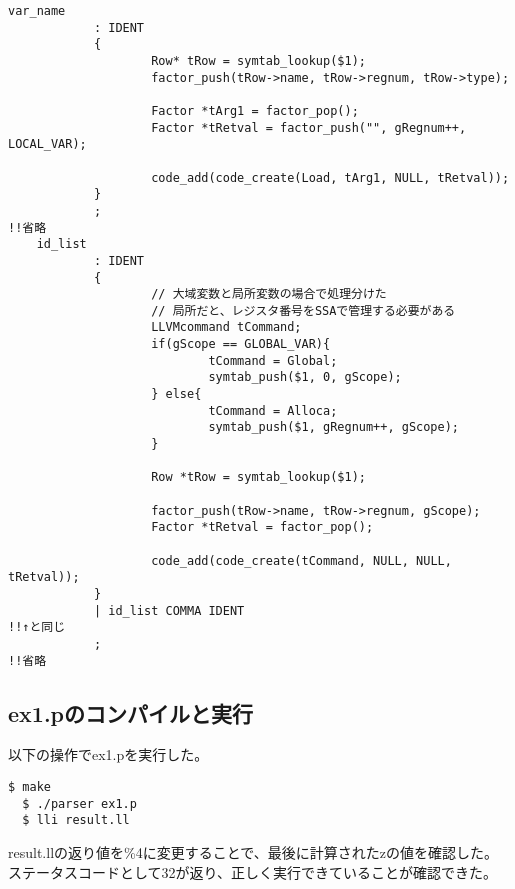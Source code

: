 \begin{lstlisting}[caption={parser.y},label={parser.y}]
    var_name
            : IDENT
            {
                    Row* tRow = symtab_lookup($1);
                    factor_push(tRow->name, tRow->regnum, tRow->type);
    
                    Factor *tArg1 = factor_pop();
                    Factor *tRetval = factor_push("", gRegnum++, LOCAL_VAR);
    
                    code_add(code_create(Load, tArg1, NULL, tRetval));
            }
            ;
!!省略
    id_list
            : IDENT
            {
                    // 大域変数と局所変数の場合で処理分けた
                    // 局所だと、レジスタ番号をSSAで管理する必要がある
                    LLVMcommand tCommand;
                    if(gScope == GLOBAL_VAR){
                            tCommand = Global;
                            symtab_push($1, 0, gScope);
                    } else{
                            tCommand = Alloca;
                            symtab_push($1, gRegnum++, gScope);
                    }
    
                    Row *tRow = symtab_lookup($1);
    
                    factor_push(tRow->name, tRow->regnum, gScope);
                    Factor *tRetval = factor_pop();
    
                    code_add(code_create(tCommand, NULL, NULL, tRetval));
            }
            | id_list COMMA IDENT
!!↑と同じ
            ;
!!省略
\end{lstlisting}


\subsection{ex1.pのコンパイルと実行}
以下の操作でex1.pを実行した。
\begin{lstlisting}[caption={ex.pの実行},label={ex.pの実行}]
  $ make
  $ ./parser ex1.p
  $ lli result.ll
\end{lstlisting}

result.llの返り値を\%4に変更することで、最後に計算されたzの値を確認した。
ステータスコードとして32が返り、正しく実行できていることが確認できた。
